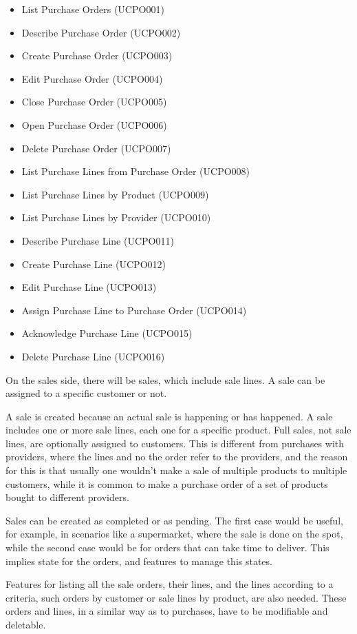 \begin{itemize}
\item List Purchase Orders (UCPO001)
\item Describe Purchase Order (UCPO002)
\item Create Purchase Order (UCPO003)
\item Edit Purchase Order (UCPO004)
\item Close Purchase Order (UCPO005)
\item Open Purchase Order (UCPO006)
\item Delete Purchase Order (UCPO007)
\item List Purchase Lines from Purchase Order (UCPO008)
\item List Purchase Lines by Product (UCPO009)
\item List Purchase Lines by Provider (UCPO010)
\item Describe Purchase Line (UCPO011)
\item Create Purchase Line (UCPO012)
\item Edit Purchase Line (UCPO013)
\item Assign Purchase Line to Purchase Order (UCPO014)
\item Acknowledge Purchase Line (UCPO015)
\item Delete Purchase Line (UCPO016)
\end{itemize}

On the sales side, there will be sales, which include sale lines. A sale can be assigned to a specific customer or not.

A sale is created because an actual sale is happening or has happened. A sale includes one or more sale lines, each one for a specific product. Full sales, not sale lines, are optionally assigned to customers. This is different from purchases with providers, where the lines and no the order refer to the providers, and the reason for this is that usually one wouldn’t make a sale of multiple products to multiple customers, while it is common to make a purchase order of a set of products bought to different providers.

Sales can be created as completed or as pending. The first case would be useful, for example, in scenarios like a supermarket, where the sale is done on the spot, while the second case would be for orders that can take time to deliver. This implies state for the orders, and features to manage this states.

Features for listing all the sale orders, their lines, and the lines according to a criteria, such orders by customer or sale lines by product, are also needed. These orders and lines, in a similar way as to purchases, have to be modifiable and deletable.

